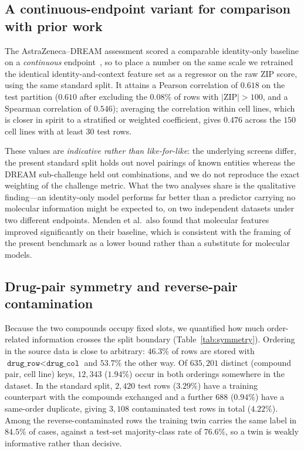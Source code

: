 \documentclass{bmcart}
\begin{document}
\subsection*{A continuous-endpoint variant for comparison with prior work}
The AstraZeneca--DREAM assessment scored a comparable identity-only baseline on a \emph{continuous}
endpoint~\cite{menden2019}, so to place a number on the same scale we retrained the identical
identity-and-context feature set as a regressor on the raw ZIP score, using the same standard split.
It attains a Pearson correlation of $0.618$ on the test partition ($0.610$ after excluding the
$0.08\%$ of rows with $|$ZIP$| > 100$, and a Spearman correlation of $0.546$); averaging the
correlation within cell lines, which is closer in spirit to a stratified or weighted coefficient, gives
$0.476$ across the $150$ cell lines with at least $30$ test rows.

These values are \emph{indicative rather than like-for-like}: the underlying screens differ, the
present standard split holds out novel pairings of known entities whereas the DREAM sub-challenge held
out combinations, and we do not reproduce the exact weighting of the challenge metric. What the two
analyses share is the qualitative finding---an identity-only model performs far better than a predictor
carrying no molecular information might be expected to, on two independent datasets under two different
endpoints. Menden et al.\ also found that molecular features improved significantly on their baseline,
which is consistent with the framing of the present benchmark as a lower bound rather than a substitute
for molecular models.

\subsection*{Drug-pair symmetry and reverse-pair contamination}
Because the two compounds occupy fixed slots, we quantified how much order-related information crosses
the split boundary (Table~\ref{tab:symmetry}). Ordering in the source data is close to arbitrary:
$46.3\%$ of rows are stored with $\texttt{drug\_row}<\texttt{drug\_col}$ and $53.7\%$ the other way.
Of $635{,}201$ distinct (compound pair, cell line) keys, $12{,}343$ ($1.94\%$) occur in both orderings
somewhere in the dataset. In the standard split, $2{,}420$ test rows ($3.29\%$) have a training
counterpart with the compounds exchanged and a further $688$ ($0.94\%$) have a same-order duplicate,
giving $3{,}108$ contaminated test rows in total ($4.22\%$). Among the reverse-contaminated rows the
training twin carries the same label in $84.5\%$ of cases, against a test-set majority-class rate of
$76.6\%$, so a twin is weakly informative rather than decisive.
\end{document}
